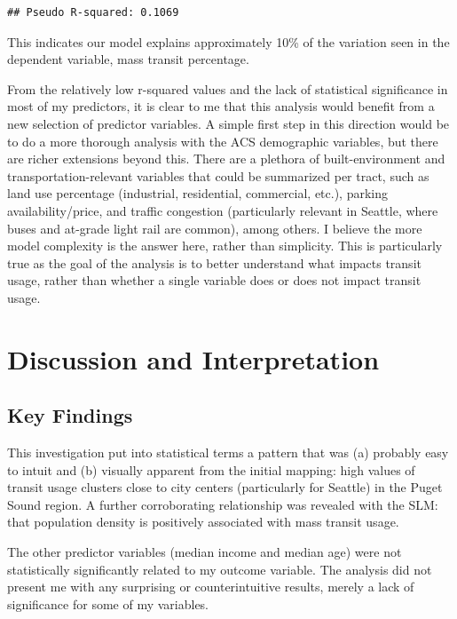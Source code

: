 \documentclass[
]{article}
\begin{document}
\begin{verbatim}
## Pseudo R-squared: 0.1069
\end{verbatim}

This indicates our model explains approximately 10\% of the variation
seen in the dependent variable, mass transit percentage.

From the relatively low r-squared values and the lack of statistical
significance in most of my predictors, it is clear to me that this
analysis would benefit from a new selection of predictor variables. A
simple first step in this direction would be to do a more thorough
analysis with the ACS demographic variables, but there are richer
extensions beyond this. There are a plethora of built-environment and
transportation-relevant variables that could be summarized per tract,
such as land use percentage (industrial, residential, commercial, etc.),
parking availability/price, and traffic congestion (particularly
relevant in Seattle, where buses and at-grade light rail are common),
among others. I believe the more model complexity is the answer here,
rather than simplicity. This is particularly true as the goal of the
analysis is to better understand what impacts transit usage, rather than
whether a single variable does or does not impact transit usage.

\section{Discussion and
Interpretation}\label{discussion-and-interpretation}

\subsection{Key Findings}\label{key-findings}

This investigation put into statistical terms a pattern that was (a)
probably easy to intuit and (b) visually apparent from the initial
mapping: high values of transit usage clusters close to city centers
(particularly for Seattle) in the Puget Sound region. A further
corroborating relationship was revealed with the SLM: that population
density is positively associated with mass transit usage.

The other predictor variables (median income and median age) were not
statistically significantly related to my outcome variable. The analysis
did not present me with any surprising or counterintuitive results,
merely a lack of significance for some of my variables.
\end{document}
